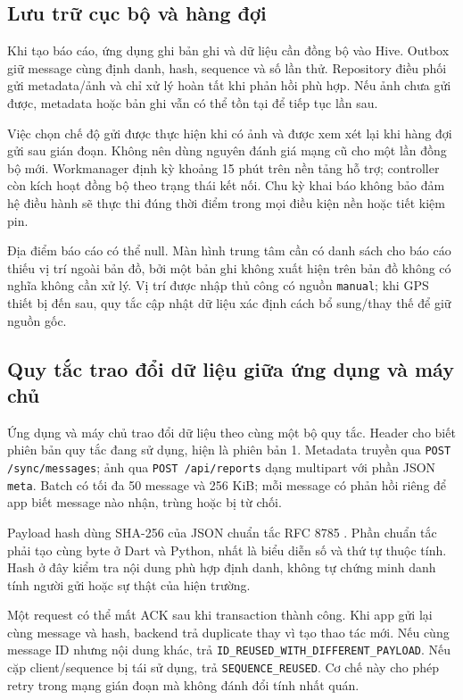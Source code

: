 \subsection{Lưu trữ cục bộ và hàng đợi}
Khi tạo báo cáo, ứng dụng ghi bản ghi và dữ liệu cần đồng bộ vào Hive. Outbox giữ message cùng định danh, hash, sequence và số lần thử. Repository điều phối gửi metadata/ảnh và chỉ xử lý hoàn tất khi phản hồi phù hợp. Nếu ảnh chưa gửi được, metadata hoặc bản ghi vẫn có thể tồn tại để tiếp tục lần sau.

Việc chọn chế độ gửi được thực hiện khi có ảnh và được xem xét lại khi hàng đợi gửi sau gián đoạn. Không nên dùng nguyên đánh giá mạng cũ cho một lần đồng bộ mới. Workmanager định kỳ khoảng 15 phút trên nền tảng hỗ trợ; controller còn kích hoạt đồng bộ theo trạng thái kết nối. Chu kỳ khai báo không bảo đảm hệ điều hành sẽ thực thi đúng thời điểm trong mọi điều kiện nền hoặc tiết kiệm pin.

Địa điểm báo cáo có thể null. Màn hình trung tâm cần có danh sách cho báo cáo thiếu vị trí ngoài bản đồ, bởi một bản ghi không xuất hiện trên bản đồ không có nghĩa không cần xử lý. Vị trí được nhập thủ công có nguồn \texttt{manual}; khi GPS thiết bị đến sau, quy tắc cập nhật dữ liệu xác định cách bổ sung/thay thế để giữ nguồn gốc.

\subsection{Quy tắc trao đổi dữ liệu giữa ứng dụng và máy chủ}
Ứng dụng và máy chủ trao đổi dữ liệu theo cùng một bộ quy tắc. Header  cho biết phiên bản quy tắc đang sử dụng, hiện là phiên bản 1. Metadata truyền qua \texttt{POST /sync/messages}; ảnh qua \texttt{POST /api/reports} dạng multipart với phần JSON \texttt{meta}. Batch có tối đa 50 message và 256 KiB; mỗi message có phản hồi riêng để app biết message nào nhận, trùng hoặc bị từ chối.

Payload hash dùng SHA-256 của JSON chuẩn tắc RFC 8785 \citep{rfc8785}. Phần chuẩn tắc phải tạo cùng byte ở Dart và Python, nhất là biểu diễn số và thứ tự thuộc tính. Hash ở đây kiểm tra nội dung phù hợp định danh, không tự chứng minh danh tính người gửi hoặc sự thật của hiện trường.

Một request có thể mất ACK sau khi transaction thành công. Khi app gửi lại cùng message và hash, backend trả duplicate thay vì tạo thao tác mới. Nếu cùng message ID nhưng nội dung khác, trả \texttt{ID\_REUSED\_WITH\_DIFFERENT\_PAYLOAD}. Nếu cặp client/sequence bị tái sử dụng, trả \texttt{SEQUENCE\_REUSED}. Cơ chế này cho phép retry trong mạng gián đoạn mà không đánh đổi tính nhất quán.

